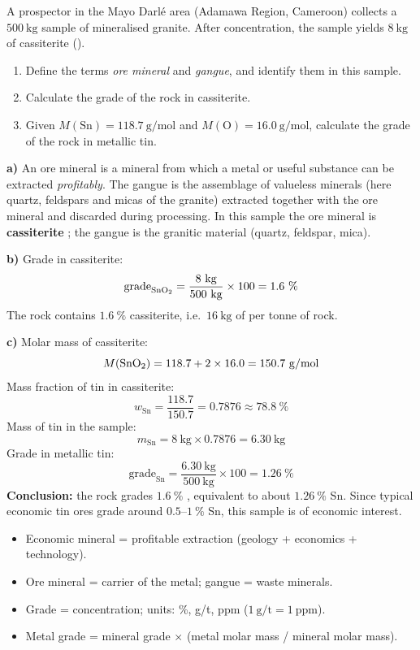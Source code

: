 \documentclass[11pt]{article}
\newcommand{\cle}[1]{{\popxbold\color{popdark}#1}}
\begin{document}
\begin{exoresolu}
A prospector in the Mayo Darl\'e area (Adamawa Region, Cameroon) collects a $500\ \mathrm{kg}$ sample of mineralised granite. After concentration, the sample yields $8\ \mathrm{kg}$ of cassiterite ().
\begin{enumerate}
\item[a)] Define the terms \emph{ore mineral} and \emph{gangue}, and identify them in this sample.
\item[b)] Calculate the grade of the rock in cassiterite.
\item[c)] Given $M(\mathrm{Sn}) = 118.7\ \mathrm{g/mol}$ and $M(\mathrm{O}) = 16.0\ \mathrm{g/mol}$, calculate the grade of the rock in metallic tin.
\end{enumerate}
\tcblower
\textbf{a)} An \cle{ore mineral} is a mineral from which a metal or useful substance can be extracted \emph{profitably}. The \cle{gangue} is the assemblage of valueless minerals (here quartz, feldspars and micas of the granite) extracted together with the ore mineral and discarded during processing. In this sample the ore mineral is \textbf{cassiterite }; the gangue is the granitic material (quartz, feldspar, mica).

\textbf{b)} Grade in cassiterite:
\[
\text{grade}_{\ce{SnO2}} = \frac{8\ \mathrm{kg}}{500\ \mathrm{kg}} \times 100 = 1.6\ \%
\]
The rock contains $1.6\ \%$ cassiterite, i.e.\ $16\ \mathrm{kg}$ of  per tonne of rock.

\textbf{c)} Molar mass of cassiterite:
\[
M(\ce{SnO2}) = 118.7 + 2 \times 16.0 = 150.7\ \mathrm{g/mol}
\]
Mass fraction of tin in cassiterite:
\[
w_{\mathrm{Sn}} = \frac{118.7}{150.7} = 0.7876 \approx 78.8\ \%
\]
Mass of tin in the sample:
\[
m_{\mathrm{Sn}} = 8\ \mathrm{kg} \times 0.7876 = 6.30\ \mathrm{kg}
\]
Grade in metallic tin:
\[
\text{grade}_{\mathrm{Sn}} = \frac{6.30\ \mathrm{kg}}{500\ \mathrm{kg}} \times 100 = 1.26\ \%
\]
\textbf{Conclusion:} the rock grades $1.6\ \%$ , equivalent to about $1.26\ \%$ Sn. Since typical economic tin ores grade around $0.5$--$1\ \%$ Sn, this sample is of economic interest.
\end{exoresolu}

\begin{aretenir}
\begin{itemize}
\item Economic mineral = profitable extraction (geology + economics + technology).
\item Ore mineral = carrier of the metal; gangue = waste minerals.
\item Grade = concentration; units: \%, g/t, ppm ($1\ \mathrm{g/t}=1\ \mathrm{ppm}$).
\item Metal grade = mineral grade $\times$ (metal molar mass / mineral molar mass).
\end{itemize}
\end{aretenir}
\end{document}
